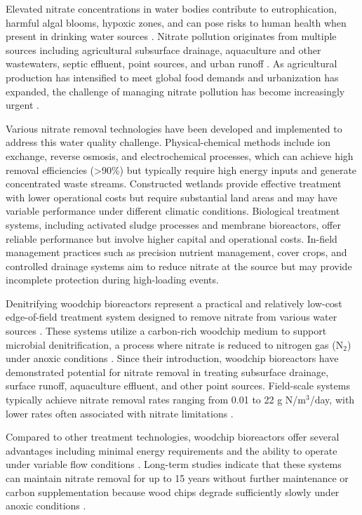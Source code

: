 \documentclass[12pt,a4paper]{article}
\begin{document}
Elevated nitrate concentrations in water bodies contribute to eutrophication, harmful algal blooms, hypoxic zones, and can pose risks to human health when present in drinking water sources \citep{RN1181}. Nitrate pollution originates from multiple sources including agricultural subsurface drainage, aquaculture and other wastewaters, septic effluent, point sources, and urban runoff \citep{RN1181, RN310}. As agricultural production has intensified to meet global food demands and urbanization has expanded, the challenge of managing nitrate pollution has become increasingly urgent \citep{RN312}.

Various nitrate removal technologies have been developed and implemented to address this water quality challenge. Physical-chemical methods include ion exchange, reverse osmosis, and electrochemical processes, which can achieve high removal efficiencies (>90\%) but typically require high energy inputs and generate concentrated waste streams. Constructed wetlands provide effective treatment with lower operational costs but require substantial land areas and may have variable performance under different climatic conditions. Biological treatment systems, including activated sludge processes and membrane bioreactors, offer reliable performance but involve higher capital and operational costs. In-field management practices such as precision nutrient management, cover crops, and controlled drainage systems aim to reduce nitrate at the source but may provide incomplete protection during high-loading events.

Denitrifying woodchip bioreactors represent a practical and relatively low-cost edge-of-field treatment system designed to remove nitrate from various water sources \citep{RN625, RN310}. These systems utilize a carbon-rich woodchip medium to support microbial denitrification, a process where nitrate is reduced to nitrogen gas (N$_{2}$) under anoxic conditions \citep{RN242, RN629}. Since their introduction, woodchip bioreactors have demonstrated potential for nitrate removal in treating subsurface drainage, surface runoff, aquaculture effluent, and other point sources. Field-scale systems typically achieve nitrate removal rates ranging from 0.01 to 22 g N/m$^3$/day, with lower rates often associated with nitrate limitations \citep{RN625, RN310}.

Compared to other treatment technologies, woodchip bioreactors offer several advantages including minimal energy requirements and the ability to operate under variable flow conditions \citep{RN625, RN310}. Long-term studies indicate that these systems can maintain nitrate removal for up to 15 years without further maintenance or carbon supplementation because wood chips degrade sufficiently slowly under anoxic conditions \citep{RN625, RN629}.
\end{document}
